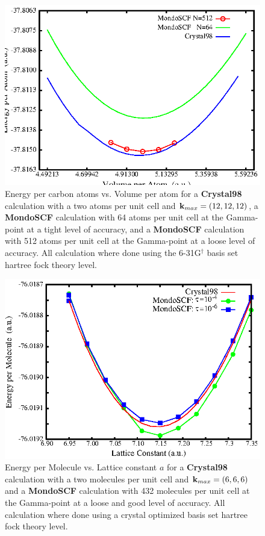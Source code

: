 \documentclass[prb,aps,nobibnotes,twocolumn,doublespace,twocolumngrid,superbib]{revtex4}
\begin{document}
%
%
%
\begin{figure}
\caption{Energy per carbon atoms vs. Volume per atom  for a {\bf Crystal98} calculation 
with a two atoms per unit
cell and ${\bf k}_{max} = (12,12,12)$, a {\bf MondoSCF} calculation with 64 atoms per
unit cell at the Gamma-point at a tight level of accuracy, and a {\bf MondoSCF} calculation 
with 512 atoms  per
unit cell at the Gamma-point at a loose level of accuracy.
All calculation where done using the 
6-31G$ ^\dagger$ basis set hartree fock theory level. }
\label{figure:EnergyVsLattice}
{\centering \includegraphics{Diamond_En_vs_a.ps} \par} 
\end{figure}
%
%
%
\begin{figure}
\caption{Energy per Molecule vs.  Lattice constant  $a$  for a {\bf Crystal98} calculation 
with a two molecules per unit cell and ${\bf k}_{max} = (6,6,6)$ and a {\bf MondoSCF} 
calculation
with 432 molecules  per unit cell at the Gamma-point at a loose and good level of accuracy.
All calculation where done using a crystal optimized basis set\cite{CBS:511G:H,CBS:861G:MgO} 
hartree fock theory level. }
\label{figure:EnergyVsLattice_Ice}
{\centering \includegraphics{pIce_En_vs_a.ps} \par} 
\end{figure}
%
%
%
%
\end{document}
